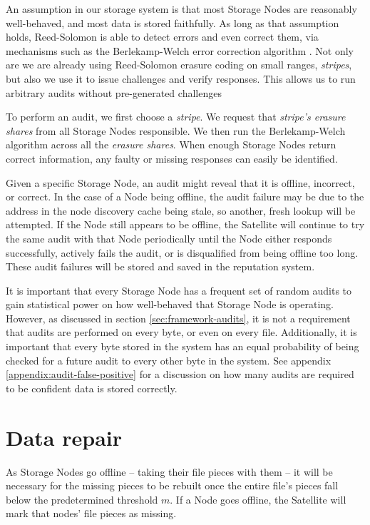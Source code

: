 \documentclass[8pt,fleqn,openany]{book}
\begin{document}
An assumption in our storage system is that most Storage Nodes are
reasonably well-behaved, and most data is stored faithfully. As long as that
assumption holds, Reed-Solomon is able to detect errors and even correct them,
via mechanisms such as the Berlekamp-Welch error correction algorithm \cite{bw}.
Not only are we are already using Reed-Solomon erasure coding
\cite{rs} on small ranges, {\em stripes}, but also we use it to issue challenges and
verify responses. This allows us to run arbitrary audits without
pre-generated challenges

To perform an audit, we first choose a {\em stripe}. We request that
{\em stripe's erasure shares} from all Storage Nodes responsible. We then run
the Berlekamp-Welch algorithm \cite{bw} across all the {\em erasure shares}. When
enough Storage Nodes return correct information, any faulty or missing responses
can easily be identified.

Given a specific Storage Node, an audit might reveal that it is offline,
incorrect, or correct. In the case of a Node being offline, the audit failure
may be due to the address in the node discovery cache being stale, so another,
fresh lookup will be attempted. If the Node still appears to be offline,
the Satellite will continue to try the same audit with that Node periodically
until the Node either responds successfully, actively fails the audit, or
is disqualified from being offline too long.
These audit failures will be stored and saved in the reputation system.

It is important that every Storage Node has a frequent set of random audits to
gain statistical power on how well-behaved that Storage Node is operating. However, as
discussed in section \ref{sec:framework-audits}, it is
not a requirement that audits are performed on every byte, or even on every
file.
Additionally, it is important that every byte stored in the system has an equal
probability of being checked for a future audit to every other byte in the
system. See appendix \ref{appendix:audit-false-positive} for a discussion on
how many audits are required to be confident data is stored correctly.

\section{Data repair}\label{sec:concrete-data-repair}

As Storage Nodes go offline -- taking their file pieces with them -- it will
be necessary for the missing pieces to be rebuilt once the entire file's pieces
fall below the predetermined threshold $m$. If a Node goes offline, the
Satellite will mark that nodes' file pieces as missing.
\end{document}
